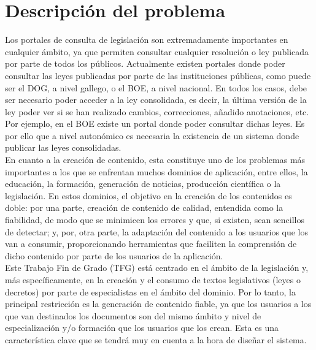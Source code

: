 \section{Descripción del problema}

Los portales de consulta de legislación son extremadamente importantes en cualquier ámbito, ya que permiten consultar cualquier resolución o ley publicada por parte de todos los públicos. Actualmente existen portales donde poder consultar las leyes publicadas por parte de las instituciones públicas, como puede ser el DOG, a nivel gallego, o el BOE, a nivel nacional. En todos los casos, debe ser necesario poder acceder a la ley consolidada, es decir, la última versión de la ley poder ver si se han realizado cambios, correcciones, añadido anotaciones, etc. Por ejemplo, en el BOE existe un portal \cite{boe} donde poder consultar dichas leyes. Es por ello que a nivel autonómico es necesaria la existencia de un sistema donde publicar las leyes consolidadas.
\\

En cuanto a la creación de contenido, esta constituye uno de los problemas más importantes a los que se enfrentan muchos dominios de aplicación, entre ellos, la educación, la formación, generación de noticias, producción científica o la legislación. En estos dominios, el objetivo en la creación de los contenidos es doble: por una parte, creación de contenido de calidad, entendida como la fiabilidad, de modo que se minimicen los errores y que, si existen, sean sencillos de detectar; y, por, otra parte, la adaptación del contenido a los usuarios que los van a consumir, proporcionando herramientas que faciliten la comprensión de dicho contenido por parte de los usuarios de la aplicación.
\\

Este Trabajo Fin de Grado (TFG) está centrado en el ámbito de la legislación y, más específicamente, en la creación y el consumo de textos legislativos (leyes o decretos) por parte de especialistas en el ámbito del dominio. Por lo tanto, la principal restricción es la generación de contenido fiable, ya que los usuarios a los que van destinados los documentos son del mismo ámbito y nivel de especialización y/o formación que los usuarios que los crean. Esta es una característica clave que se tendrá muy en cuenta a la hora de diseñar el sistema.
\\

